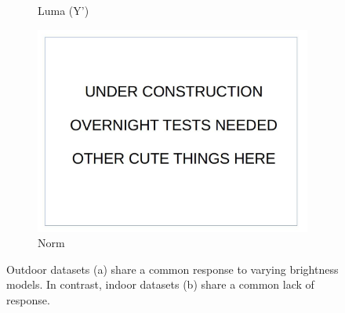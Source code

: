 \documentclass[12pt]{report}
\begin{document}
\begin{figure}
\begin{subfigure}{.49\linewidth}
  \caption{Luma (Y')}
\end{subfigure}
\hfill
\begin{subfigure}{.49\linewidth}
  \includegraphics[width=1\linewidth]{figures/placeholder.jpg}
  \caption{Norm}
\end{subfigure}

\caption{Outdoor datasets (a) share a common response to varying brightness models. In contrast, indoor datasets (b) share a common lack of response.}
\label{fig:brightness_indoor_outdoor}
\end{figure}
\end{document}
